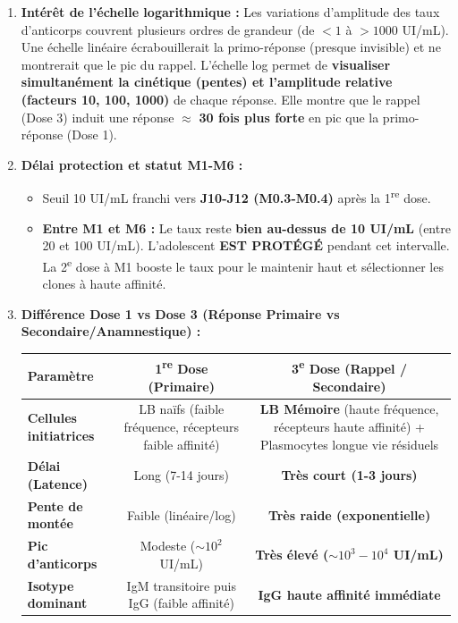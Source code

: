 \documentclass[11pt]{article}
\begin{document}
\begin{exoresolu}
\begin{enumerate}
\begin{itemize}
        \end{itemize}
        \item \textbf{Intérêt de l'échelle logarithmique :} Les variations d'amplitude des taux d'anticorps couvrent plusieurs ordres de grandeur (de $<1$ à $>1000$ UI/mL). Une échelle linéaire écrabouillerait la primo-réponse (presque invisible) et ne montrerait que le pic du rappel. L'échelle log permet de \textbf{visualiser simultanément la cinétique (pentes) et l'amplitude relative (facteurs 10, 100, 1000)} de chaque réponse. Elle montre que le rappel (Dose 3) induit une réponse $\approx$ \textbf{30 fois plus forte} en pic que la primo-réponse (Dose 1).
        \item \textbf{Délai protection et statut M1-M6 :}
        \begin{itemize}
            \item Seuil 10 UI/mL franchi vers \textbf{J10-J12 (M0.3-M0.4)} après la 1\textsuperscript{re} dose.
            \item \textbf{Entre M1 et M6 :} Le taux reste \textbf{bien au-dessus de 10 UI/mL} (entre 20 et 100 UI/mL). L'adolescent \textbf{EST PROTÉGÉ} pendant cet intervalle. La 2\textsuperscript{e} dose à M1 booste le taux pour le maintenir haut et sélectionner les clones à haute affinité.
        \end{itemize}
        \item \textbf{Différence Dose 1 vs Dose 3 (Réponse Primaire vs Secondaire/Anamnestique) :}
        \begin{center}
        \begin{tabular}{|l|c|c|}\hline
        \textbf{Paramètre} & \textbf{1\textsuperscript{re} Dose (Primaire)} & \textbf{3\textsuperscript{e} Dose (Rappel / Secondaire)} \\ \hline
        \textbf{Cellules initiatrices} & LB naïfs (faible fréquence, récepteurs faible affinité) & \textbf{LB Mémoire} (haute fréquence, récepteurs haute affinité) + Plasmocytes longue vie résiduels \\ \hline
        \textbf{Délai (Latence)} & Long (7-14 jours) & \textbf{Très court (1-3 jours)} \\ \hline
        \textbf{Pente de montée} & Faible (linéaire/log) & \textbf{Très raide (exponentielle)} \\ \hline
        \textbf{Pic d'anticorps} & Modeste ($\sim 10^2$ UI/mL) & \textbf{Très élevé ($\sim 10^3-10^4$ UI/mL)} \\ \hline
        \textbf{Isotype dominant} & IgM transitoire puis IgG (faible affinité) & \textbf{IgG haute affinité immédiate} \\ \hline

\end{tabular}
\end{center}
\end{enumerate}
\end{exoresolu}
\end{document}
